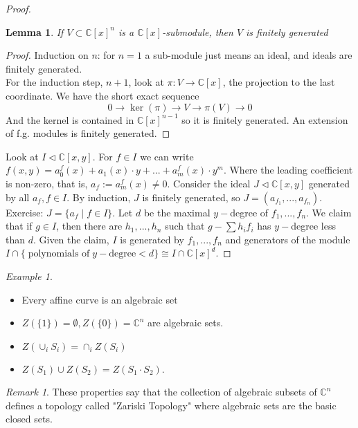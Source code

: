\documentclass[12pt]{article}
\newtheorem{lemma}[theorem]{Lemma}
\theoremstyle{remark}
\newtheorem{remark}[theorem]{Remark}
\newtheorem{example}[theorem]{Example}
\newcommand{\C}{\mathbb{C}}
\begin{document}
\begin{proof}
\begin{lemma}
If $V \subset \C[x]^n$ is a $\C[x]$-submodule, then $V$ is finitely generated
\end{lemma}
\begin{proof}
Induction on $n$: for $n=1$ a sub-module just means an ideal, and ideals are finitely generated. \\

For the induction step, $n+1$, look at $\pi: V \rightarrow \C[x]$, the projection to the last coordinate. We have the short exact sequence $$
0 \rightarrow \ker(\pi) \rightarrow V \rightarrow \pi(V) \rightarrow 0 $$
And the kernel is contained in $\C[x]^{n-1}$ so it is finitely generated. An extension of f.g. modules is finitely generated.
\end{proof}
Look at $I \lhd \C[x,y]$. For $f \in I$ we can write $f(x,y) = a_0^f(x)+a_1(x)\cdot y +... +a_m^f(x) \cdot y^m$. Where the leading coefficient is non-zero, that is, $a_f:= a_m^f(x) \neq 0$. Consider the ideal $J \lhd \C[x,y]$ generated by all $a_f, f \in I$. By induction, $J$ is finitely generated, so $J = (a_{f_1},...,a_{f_n})$. Exercise: $J = \{ a_f \; | \; f \in I\}$. Let $d$ be the maximal $y-$degree of $f_1,...,f_n$. We claim that if $g \in I$, then there are $h_1,...,h_n$ such that $g - \sum h_i f_i$ has $y-$degree less than $d$. Given the claim, $I$ is generated by $f_1,...,f_n$ and generators of the module $I \cap \{ \; \text{polynomials of} \; y- \text{degree} < d  \} \cong I \cap \C[x]^d$.
\end{proof}
\begin{example}
\begin{itemize}
\item Every affine curve is an algebraic set
\item $Z(\{ 1 \}) = \emptyset, Z(\{ 0 \}) = \C^n $ are algebraic sets.
\item $Z(\cup_i S_i) = \cap_i Z(S_i)$
\item $Z(S_1) \cup Z(S_2) = Z(S_1 \cdot S_2)$.

\end{itemize}



\end{example}

\begin{remark}
These properties say that the collection of algebraic subsets of $\C^n$ defines a topology called "Zariski Topology" where algebraic sets are the basic closed sets.
\end{remark}
\end{document}
